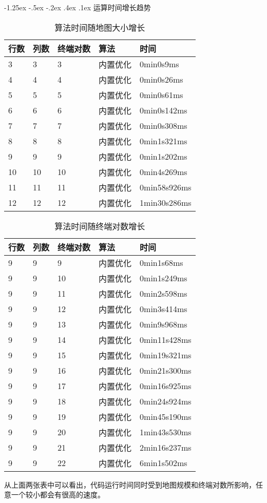 \documentclass[a4paper, 11pt]{article}
\makeatletter
\newcommand{\sihao}{\fontsize{14pt}{\baselineskip}\selectfont}
\renewcommand\subsection{\@startsection{subsection}{1}{\z@}%
{-1.25ex \@plus -.5ex \@minus -.2ex}%
{.4ex \@plus .1ex}%
{\normalfont\sihao\CJKfamily{hei}}}
\makeatother
\begin{document}
\subsection{运算时间增长趋势}
\begin{table}[!htp]
	\centering
	\begin{tabular}{@{}lllll@{}}
		\toprule
		行数 & 列数 & 终端对数 & 算法 & 时间 \\ \midrule
		3 & 3 & 3 & 内置优化 & 0min0s9ms \\
		4 & 4 & 4 & 内置优化 & 0min0s26ms \\
		5 & 5 & 5 & 内置优化 & 0min0s61ms \\
		6 & 6 & 6 & 内置优化 & 0min0s142ms \\
		7 & 7 & 7 & 内置优化 & 0min0s308ms \\
		8 & 8 & 8 & 内置优化 & 0min1s321ms \\
		9 & 9 & 9 & 内置优化 & 0min1s202ms \\
		10 & 10 & 10 & 内置优化 & 0min4s269ms \\
		11 & 11 & 11 & 内置优化 & 0min58s926ms \\
		12 & 12 & 12 & 内置优化 & 1min30s286ms \\
		\bottomrule
	\end{tabular}
	\caption{算法时间随地图大小增长}
	\label{my-label}
\end{table}

\begin{table}[!htp]
	\centering
	\begin{tabular}{@{}lllll@{}}
		\toprule
		行数 & 列数 & 终端对数 & 算法 & 时间 \\ \midrule
		9 & 9 & 9 & 内置优化 & 0min1s68ms \\
		9 & 9 & 10 & 内置优化 & 0min1s249ms \\
		9 & 9 & 11 & 内置优化 & 0min2s598ms \\
		9 & 9 & 12 & 内置优化 & 0min3s414ms \\
		9 & 9 & 13 & 内置优化 & 0min9s968ms \\
		9 & 9 & 14 & 内置优化 & 0min11s428ms \\
		9 & 9 & 15 & 内置优化 & 0min19s321ms \\
		9 & 9 & 16 & 内置优化 & 0min21s300ms \\
		9 & 9 & 17 & 内置优化 & 0min16s925ms \\
		9 & 9 & 18 & 内置优化 & 0min24s924ms \\
		9 & 9 & 19 & 内置优化 & 0min45s190ms \\
		9 & 9 & 20 & 内置优化 & 1min43s530ms \\
		9 & 9 & 21 & 内置优化 & 2min16s237ms \\
		9 & 9 & 22 & 内置优化 & 6min1s502ms \\
		\bottomrule
	\end{tabular}
	\caption{算法时间随终端对数增长}
	\label{my-label}
\end{table}

从上面两张表中可以看出，代码运行时间同时受到地图规模和终端对数所影响，任意一个较小都会有很高的速度。
\end{document}
